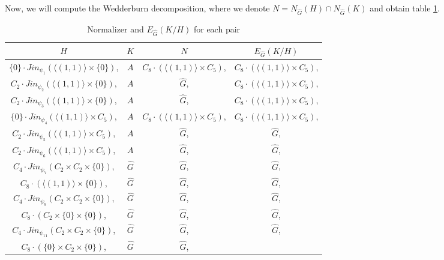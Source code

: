 \documentclass{article}
\begin{document}
Now, we will compute the Wedderburn decomposition, where we denote $N=N_{\hat{G}}(H) \cap N_{\hat{G}}(K) $ and obtain table \ref{table7}.

\begin{table} 
\caption{Normalizer and $E_{\hat{G}}(K/H)$ for each pair}\label{table7}
\begin{tabular}{cccc}
    \toprule
    $H$ & $K$ & $N $ &  $E_{\hat{G}}(K/H)$ \\ 
    \midrule
    $\{0\} \cdot Jin_{\psi_{1}}(\langle (1,1) \rangle \times \{0\} ) $,   &
 $A$  &
     $C_{8} \cdot (\langle (1,1) \rangle \times C_5) $,   &
     $C_{8} \cdot (\langle (1,1) \rangle \times C_5) $,  \\
     $C_{2} \cdot Jin_{\psi_{2}}(\langle (1,1) \rangle \times \{0\} ) $,   &
 $A$  &
     $\hat{G} $,   &
     $C_{8} \cdot (\langle (1,1) \rangle \times C_5) $,  \\
     $C_{2} \cdot Jin_{\psi_{3}}(\langle (1,1) \rangle \times \{0\} ) $,   &
 $A$  &
     $\hat{G} $,   &
     $C_{8} \cdot (\langle (1,1) \rangle \times C_5) $,  \\
     $\{0\} \cdot Jin_{\psi_{4}}(\langle (1,1) \rangle \times C_5) $,   &
 $A$  &
     $C_{8} \cdot (\langle (1,1) \rangle \times C_5) $,   &
     $C_{8} \cdot (\langle (1,1) \rangle \times C_5) $,  \\
     $C_{2} \cdot Jin_{\psi_{5}}(\langle (1,1) \rangle \times C_5) $,   &
 $A$  &
     $\hat{G} $,   &
     $\hat{G} $,  \\
     $C_{2} \cdot Jin_{\psi_{6}}(\langle (1,1) \rangle \times C_5) $,   &
 $A$  &
     $\hat{G} $,   &
     $\hat{G} $,  \\
     $C_{4} \cdot Jin_{\psi_{7}}(C_2 \times C_2 \times \{0\} ) $,   &
 $\hat{G}$  &
     $\hat{G} $,   &
     $\hat{G} $,  \\
     $C_{8} \cdot (\langle (1,1) \rangle \times \{0\} ) $,   &
 $\hat{G}$  &
     $\hat{G} $,   &
     $\hat{G} $,  \\
     $C_{4} \cdot Jin_{\psi_{9}}(C_2 \times C_2 \times \{0\} ) $,   &
 $\hat{G}$  &
     $\hat{G} $,   &
     $\hat{G} $,  \\
     $C_{8} \cdot(C_2 \times \{0\}  \times \{0\} ) $,   &
 $\hat{G}$  &
     $\hat{G} $,   &
     $\hat{G} $,  \\
     $C_{4} \cdot Jin_{\psi_{11}}(C_2 \times C_2 \times \{0\} ) $,   &
 $\hat{G}$  &
     $\hat{G} $,   &
     $\hat{G} $,  \\
     $C_{8} \cdot(\{0\} \times C_2 \times \{0\} ) $,   &
 $\hat{G}$  &
     $\hat{G} $,   &

\end{tabular}
\end{table}
\end{document}
